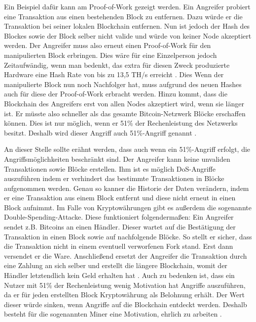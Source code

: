 Ein Beispiel dafür kann am Proof-of-Work gezeigt werden. Ein Angreifer probiert eine Transaktion aus einen bestehenden Block zu entfernen. Dazu würde er die Transaktion bei seiner lokalen Blockchain entfernen. Nun ist jedoch der Hash des Blockes sowie der Block selber nicht valide und würde von keiner Node akzeptiert werden. Der Angreifer muss also erneut einen Proof-of-Work für den manipulierten Block erbringen. Dies wäre für eine Einzelperson jedoch Zeitaufwändig, wenn man bedenkt, das extra für diesen Zweck produzierte Hardware eine Hash Rate von bis zu 13,5 TH/s erreicht \cite{Mining?LearnBitcoinmining}. Dies  Wenn der manipulierte Block nun noch Nachfolger hat, muss aufgrund des neuen Hashes auch für diese der Proof-of-Work erbracht werden. Hinzu kommt, dass die Blockchain des Angreifers erst von allen Nodes akzeptiert wird, wenn sie länger ist. Er müsste also schneller als das gesamte Bitcoin-Netzwerk Blöcke erschaffen können.  Dies ist nur möglich, wenn er 51\% der Rechenleistung des Netzwerks besitzt. Deshalb wird dieser Angriff auch 51\%-Angriff genannt \cite{SwanBlockchainblueprintnew2015} \cite{EthereumWhitepaper2017}.

An dieser Stelle sollte erähnt werden, dass auch wenn ein 51\%-Angriff erfolgt, die Angriffsmöglichkeiten beschränkt sind. Der Angreifer kann keine unvaliden Transaktionen sowie Blöcke erstellen. Ihm ist es möglich DoS-Angriffe auszuführen indem er verhindert das bestimmte Transaktionen in Blöcke aufgenommen werden. Genau so kanner die Historie der Daten verändern, indem er eine Transaktion aus einem Block entfernt und diese nicht erneut in einen Block aufnimmt. Im Falle von Kryptowährungen gibt es außerdem die sogenannte Double-Spending-Attacke. Diese funktioniert folgendermaßen: Ein Angreifer sendet z.B. Bitcoins an einen Händler. Dieser wartet auf die Bestätigung der Transaktion in einen Block sowie auf nachfolgende Blöcke. So stellt er sicher, dass die Transaktion nicht in einem eventuell verworfenen Fork stand. Erst dann versendet er die Ware. Anschließend ersetzt der Angreifer die Transaktion durch eine Zahlung an sich selber und erstellt die längere Blockchain, womit der Händler letztendlich kein Geld erhalten hat \cite{EthereumWhitepaper2017}. Auch zu bedenken ist, dass ein Nutzer mit 51\% der Rechenleistung wenig Motivation hat Angriffe auszuführen, da er für jeden erstellten Block Kryptowährung als Belohnung erhält. Der Wert dieser würde sinken, wenn Angriffe auf die Blockchain entdeckt werden. Deshalb besteht für die sogenannten Miner eine Motivation, ehrlich zu arbeiten \cite{AntonopoulosMasteringbitcoin2015}. 

